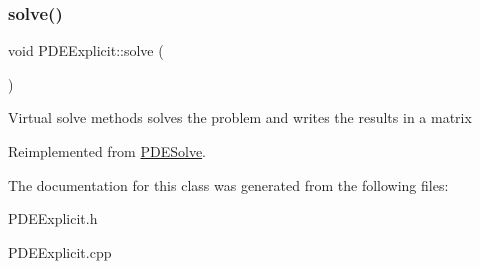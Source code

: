 \subsubsection{\texorpdfstring{solve()}{solve()}}
{\footnotesize\ttfamily void P\+D\+E\+Explicit\+::solve (\begin{DoxyParamCaption}{ }\end{DoxyParamCaption})\hspace{0.3cm}{\ttfamily [virtual]}}

Virtual solve methods solves the problem and writes the results in a matrix 

Reimplemented from \hyperlink{class_p_d_e_solve_a2fb309c3e7f35de2f639596f7fcb17cc}{P\+D\+E\+Solve}.



The documentation for this class was generated from the following files\+:\begin{DoxyCompactItemize}
\item 
P\+D\+E\+Explicit.\+h\item 
P\+D\+E\+Explicit.\+cpp\end{DoxyCompactItemize}
